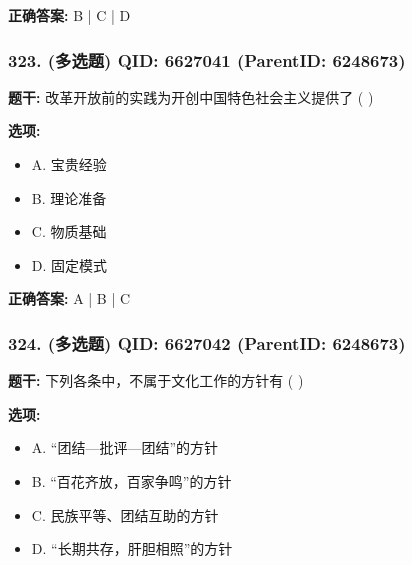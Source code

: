 \documentclass[12pt,UTF8]{ctexart}
\begin{document}
\textbf{正确答案:}
B | C | D

\vspace{0.3em}\hrulefill\vspace{0.7em}

\subsubsection*{323. (多选题) \small QID: 6627041 (ParentID: 6248673)}

\textbf{题干:}
改革开放前的实践为开创中国特色社会主义提供了  ( )



\textbf{选项:}
\begin{itemize}[leftmargin=*]

  \item A. 宝贵经验

  \item B. 理论准备

  \item C. 物质基础

  \item D. 固定模式

\end{itemize}

\textbf{正确答案:}
A | B | C

\vspace{0.3em}\hrulefill\vspace{0.7em}

\subsubsection*{324. (多选题) \small QID: 6627042 (ParentID: 6248673)}

\textbf{题干:}
下列各条中，不属于文化工作的方针有  ( )



\textbf{选项:}
\begin{itemize}[leftmargin=*]

  \item A. “团结—批评—团结”的方针

  \item B. “百花齐放，百家争鸣”的方针

  \item C. 民族平等、团结互助的方针

  \item D. “长期共存，肝胆相照”的方针

\end{itemize}
\end{document}
